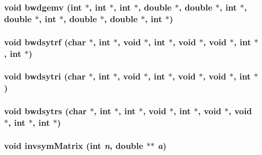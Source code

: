 \subsubsection{\setlength{\rightskip}{0pt plus 5cm}void bwdgemv (int $\ast$, int $\ast$, int $\ast$, double $\ast$, double $\ast$, int $\ast$, double $\ast$, int $\ast$, double $\ast$, double $\ast$, int $\ast$)}\label{matopt_8c_ab5fc11f7d06e1d0efde054f401aab15}


\subsubsection{\setlength{\rightskip}{0pt plus 5cm}void bwdsytrf (char $\ast$, int $\ast$, void $\ast$, int $\ast$, void $\ast$, void $\ast$, int $\ast$, int $\ast$)}\label{matopt_8c_0010c10786f1905150e3a0b5af856247}


\subsubsection{\setlength{\rightskip}{0pt plus 5cm}void bwdsytri (char $\ast$, int $\ast$, void $\ast$, int $\ast$, void $\ast$, void $\ast$, int $\ast$)}\label{matopt_8c_27a0718c8c54faf6fe71d4b998491915}


\subsubsection{\setlength{\rightskip}{0pt plus 5cm}void bwdsytrs (char $\ast$, int $\ast$, int $\ast$, void $\ast$, int $\ast$, void $\ast$, void $\ast$, int $\ast$, int $\ast$)}\label{matopt_8c_a9ada00ac1352ec9de3376438ad7e71a}


\subsubsection{\setlength{\rightskip}{0pt plus 5cm}void invsym\-Matrix (int {\em n}, double $\ast$$\ast$ {\em a})}\label{matopt_8c_bdd73000def95004e98b62963d5f8908}


